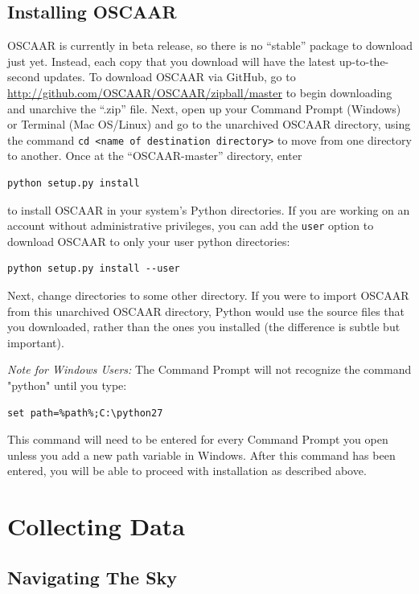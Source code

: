 \documentclass[a4paper]{article}
\newcommand{\code}[1]{\texttt{#1}}
\begin{document}
\subsection{Installing OSCAAR}
OSCAAR is currently in beta release, so there is no ``stable'' package to download just yet. Instead, each copy that you download will have the latest up-to-the-second updates. To download OSCAAR via GitHub, go to \href{https://github.com/OSCAAR/OSCAAR/zipball/master}{http://github.com/OSCAAR/OSCAAR/zipball/master} to begin downloading and unarchive the ``.zip'' file. Next, open up your Command Prompt (Windows) or Terminal (Mac OS/Linux) and go to the unarchived OSCAAR directory, using the command \code{cd <name of destination directory>} to move from one directory to another. Once at the ``OSCAAR-master'' directory, enter 
\begin{verbatim}
python setup.py install
\end{verbatim}
\noindent to install OSCAAR in your system's Python directories. If you are working on an account without administrative privileges, you can add the \code{user} option to download OSCAAR to only your user python directories:
\begin{verbatim}
python setup.py install --user
\end{verbatim}
Next, change directories to some other directory. If you were to import OSCAAR from this unarchived OSCAAR directory, Python would use the source files that you downloaded, rather than the ones you installed (the difference is subtle but important). 

\textit{Note for Windows Users:} The Command Prompt will not recognize the command "python" until you type:
\begin{verbatim}
set path=%path%;C:\python27
\end{verbatim}
This command will need to be entered for every Command Prompt you open unless you add a new path variable in Windows. After this command has been entered, you will be able to proceed with installation as described above.

\section{Collecting Data} \label{sec:collectingData}

\subsection{Navigating The Sky} \label{sec:nav}
\end{document}
